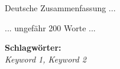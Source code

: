 \vspace{0.5cm}

Deutsche Zusammenfassung ...

... ungefähr 200 Worte ...

\textbf{Schlagwörter:}\\
\textit{Keyword 1, Keyword 2}
